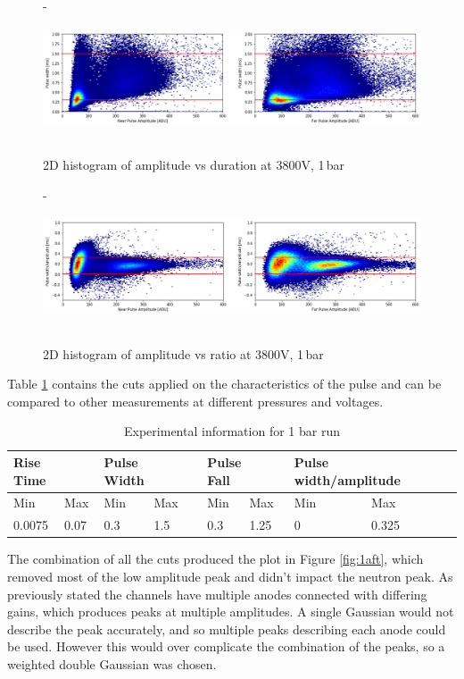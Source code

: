 \documentclass[a4paper]{article}
\begin{document}
\begin{figure}[H]- 
    \centering
    \includegraphics[height=3.7cm]{plots/uk24n001_dur.png}
    \caption{2D histogram of amplitude vs duration at 3800V, 1\,bar}
    \label{fig:1dur}
\end{figure}
\begin{figure}[H]-
    \centering
    \includegraphics[height=3.7cm]{plots/uk24n001_len.png}
    \caption{2D histogram of amplitude vs ratio at 3800V, 1\,bar}
    \label{fig:1len}
\end{figure}
\noindent Table \ref{tb:1cuts} contains the cuts applied on the characteristics of the pulse and can be compared to other measurements at different pressures and voltages.
\begin{table}[H]
\centering
\caption{Experimental information for 1 bar run}
\begin{tabular}{|l|l|l|l|l|l|l|l|} 
\hline
\multicolumn{2}{|l|}{Rise Time~~ } & \multicolumn{2}{l|}{Pulse Width~~ } & \multicolumn{2}{l|}{Pulse Fall~~ } & \multicolumn{2}{l|}{Pulse width/amplitude~~ }  \\ 
\hline
Min                         & Max  & Min                     & Max       & Min                     & Max      & Min                   & Max                    \\ 
\hline
\multicolumn{1}{|l}{0.0075} & 0.07 & \multicolumn{1}{l}{0.3} & 1.5       & \multicolumn{1}{l}{0.3} & 1.25     & \multicolumn{1}{l}{0} & 0.325                  \\
\hline
\end{tabular}
\label{tb:1cuts}
\end{table}
\noindent The combination of all the cuts produced the plot in Figure \ref{fig:1aft}, which removed most of the low amplitude peak and didn't impact the neutron peak. As previously stated the channels have multiple anodes connected with differing gains, which produces peaks at multiple amplitudes. A single Gaussian would not describe the peak accurately, and so multiple peaks describing each anode could be used. However this would over complicate the combination of the peaks, so a weighted double Gaussian was chosen. 
\end{document}
